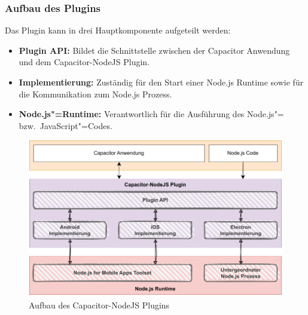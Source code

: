 \subsubsection{Aufbau des Plugins}

Das Plugin kann in drei Hauptkomponente aufgeteilt werden:

\begin{itemize}
    \item \textbf{Plugin API:} Bildet die Schnittstelle zwischen der Capacitor Anwendung und dem Capacitor-NodeJS Plugin.
    \item \textbf{Implementierung:} Zuständig für den Start einer Node.js Runtime sowie für die Kommunikation zum Node.js Prozess.
    \item \textbf{Node.js"=Runtime:} Verantwortlich für die Ausführung des Node.js"= bzw.\ JavaScript"=Codes.
\end{itemize}

\begin{figure}[H]
    \centering
    \includegraphics[width=\textwidth]{assets/02_Capacitor-NodeJS/02_Aufbau.drawio.pdf}
    \caption[Capacitor-NodeJS / Aufbau]{Aufbau des Capacitor-NodeJS Plugins}
\end{figure}
